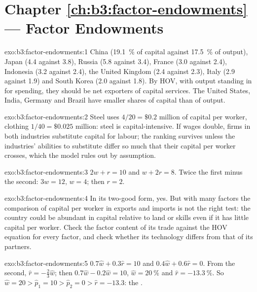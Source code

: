 \section*{Chapter \ref{ch:b3:factor-endowments} --- Factor Endowments}

\begin{solution}{exo:b3:factor-endowments:1}
China (19.1~\% of capital against 17.5~\% of output), Japan (4.4 against 3.8),
Russia (5.8 against 3.4), France (3.0 against 2.4), Indonesia (3.2 against 2.4), the
United Kingdom (2.4 against 2.3), Italy (2.9 against 1.9) and South Korea (2.0
against 1.8). %
By HOV, with output standing in for spending, they should be net exporters of
capital services. The United States, India, Germany and Brazil have smaller
shares of capital than of output.
\end{solution}

\begin{solution}{exo:b3:factor-endowments:2}
Steel uses $4/20 = \$0.2$ million of capital per worker, clothing $1/40 =
\$0.025$ million: steel is capital-intensive. If wages double, firms in both
industries substitute capital for labour; the ranking survives unless the
industries' abilities to substitute differ so much that their capital per
worker crosses, which the model rules out by assumption.
\end{solution}

\begin{solution}{exo:b3:factor-endowments:3}
$2w + r = 10$ and $w + 2r = 8$. Twice the first minus the second: $3w = 12$, $w = 4$;
then $r = 2$.
\end{solution}

\begin{solution}{exo:b3:factor-endowments:4}
In its two-good form, yes. But with many factors the comparison of capital per
worker in exports and imports is not the right test: the country could be
abundant in capital relative to land or skills even if it has little capital per
worker. Check the factor content of its trade against the HOV equation for every
factor, and check whether its technology differs from that of its partners.
\end{solution}

\begin{solution}{exo:b3:factor-endowments:5}
$0.7\hat w + 0.3\hat r = 10$ and $0.4\hat w + 0.6\hat r = 0$. From the second, $\hat r = -\tfrac23\hat
w$; then $0.7\hat w - 0.2\hat w = 10$, $\hat w = 20~\%$ and $\hat r = -13.3~\%$. So $\hat w = 20 >
\hat p_1 = 10 > \hat p_2 = 0 > \hat r = -13.3$: the .
\end{solution}

